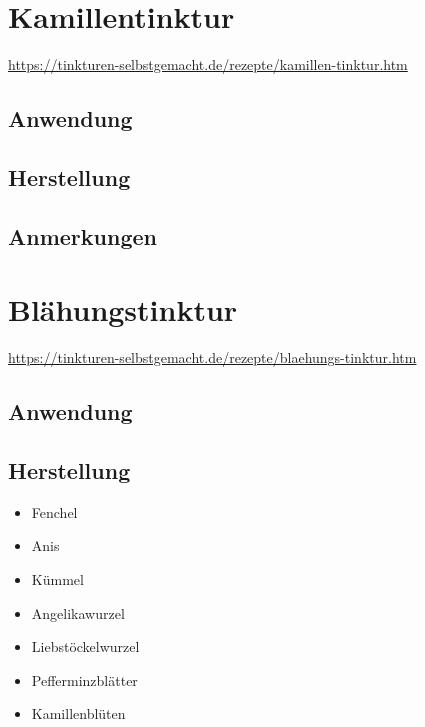 \section{Kamillentinktur}

\cite{tinkturen}

\url{https://tinkturen-selbstgemacht.de/rezepte/kamillen-tinktur.htm}

\subsection{Anwendung}

\subsection{Herstellung}

\subsection{Anmerkungen}







\section{Blähungstinktur}

\cite{tinkturen}  

\url{https://tinkturen-selbstgemacht.de/rezepte/blaehungs-tinktur.htm}

\subsection{Anwendung}


\subsection{Herstellung}


\begin{itemize}
	\item Fenchel
	\item Anis
	\item Kümmel
	\item Angelikawurzel
	\item Liebstöckelwurzel
	\item Pefferminzblätter
	\item Kamillenblüten
\end{itemize}

